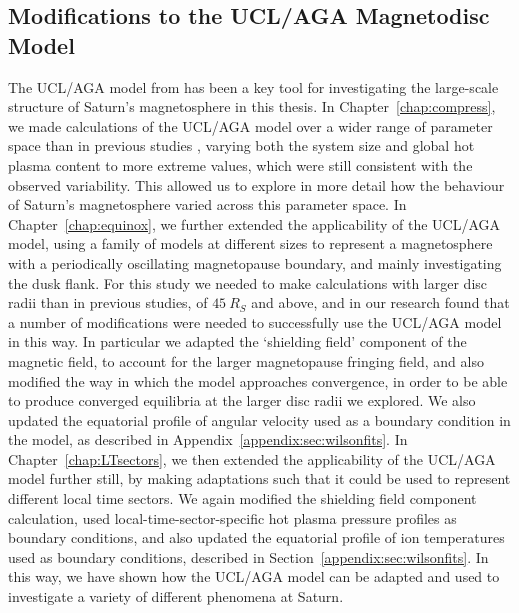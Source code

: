 \subsection{Modifications to the UCL/AGA Magnetodisc Model}
The UCL/AGA model from \citet{achilleos2010a} has been a key tool for investigating the large-scale structure of Saturn's magnetosphere in this thesis. In Chapter~\ref{chap:compress}, we made calculations of the UCL/AGA model over a wider range of parameter space than in previous studies \citep{achilleos2010a, achilleos2010b}, varying both the system size and global hot plasma content to more extreme values, which were still consistent with the observed variability. This allowed us to explore in more detail how the behaviour of Saturn's magnetosphere varied across this parameter space. In Chapter~\ref{chap:equinox}, we further extended the applicability of the UCL/AGA model, using a family of models at different sizes to represent a magnetosphere with a periodically oscillating magnetopause boundary, and mainly investigating the dusk flank. For this study we needed to make calculations with larger disc radii than in previous studies, of $\SI{45}{R_S}$ and above, and in our research found that a number of modifications were needed to successfully use the UCL/AGA model in this way. In particular we adapted the `shielding field' component of the magnetic field, to account for the larger magnetopause fringing field, and also modified the way in which the model approaches convergence, in order to be able to produce converged equilibria at the larger disc radii we explored. We also updated the equatorial profile of angular velocity used as a boundary condition in the model, as described in Appendix~\ref{appendix:sec:wilsonfits}. In Chapter~\ref{chap:LTsectors}, we then extended the applicability of the UCL/AGA model further still, by making adaptations such that it could be used to represent different local time sectors. We again modified the shielding field component calculation, used local-time-sector-specific hot plasma pressure profiles as boundary conditions, and also updated the equatorial profile of ion temperatures used as boundary conditions, described in Section~\ref{appendix:sec:wilsonfits}. In this way, we have shown how the UCL/AGA model can be adapted and used to investigate a variety of different phenomena at Saturn.

